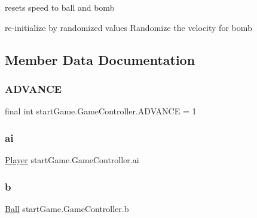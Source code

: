 resets speed to ball and bomb 

re-\/initialize by randomized values Randomize the velocity for bomb

\subsection{Member Data Documentation}
\hypertarget{classstart_game_1_1_game_controller_a36c6fcecafa6f7176733248a5cfb2c87}{}\label{classstart_game_1_1_game_controller_a36c6fcecafa6f7176733248a5cfb2c87} 
\subsubsection{\texorpdfstring{A\+D\+V\+A\+N\+CE}{ADVANCE}}
{\footnotesize\ttfamily final int start\+Game.\+Game\+Controller.\+A\+D\+V\+A\+N\+CE = 1\hspace{0.3cm}{\ttfamily [private]}}

\hypertarget{classstart_game_1_1_game_controller_a21dfca701ec83511ac399a184530fc63}{}\label{classstart_game_1_1_game_controller_a21dfca701ec83511ac399a184530fc63} 
\subsubsection{\texorpdfstring{ai}{ai}}
{\footnotesize\ttfamily \hyperlink{classmodel_1_1_player}{Player} start\+Game.\+Game\+Controller.\+ai\hspace{0.3cm}{\ttfamily [private]}}

\hypertarget{classstart_game_1_1_game_controller_a402855c8c84c77218045cc997a784693}{}\label{classstart_game_1_1_game_controller_a402855c8c84c77218045cc997a784693} 
\subsubsection{\texorpdfstring{b}{b}}
{\footnotesize\ttfamily \hyperlink{classmodel_1_1_ball}{Ball} start\+Game.\+Game\+Controller.\+b\hspace{0.3cm}{\ttfamily [private]}}

